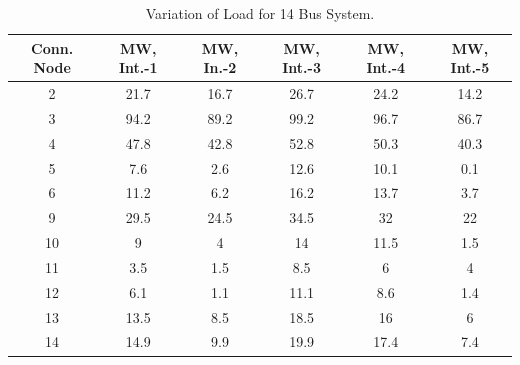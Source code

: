 \documentclass[preprint,12pt,3p]{elsarticle}
\begin{document}
\begin{table}[ht] 

\caption{Variation of Load for 14 Bus System.} %

\centering %

\begin{tabular}{| c | c | c | c | c | c |} %

\hline\hline %

Conn. Node & MW, Int.-1 & MW, In.-2 & MW, Int.-3  & MW, Int.-4 & MW, Int.-5 \\ [0.5ex] %


\hline %

2 &	21.7 &	16.7 &	26.7 &	24.2 &	14.2 \\ %
\hline
3 &	94.2 &	89.2 &	99.2 &	96.7 &	86.7 \\ %
\hline
4 &	47.8 &	42.8 &	52.8 &	50.3 &	40.3 \\ %
\hline
5 &	7.6 &	2.6 &	12.6 &	10.1 &	0.1 \\ %
\hline
6 &	11.2 &	6.2 &	16.2 &	13.7 &	3.7 \\ %
\hline
9 &	29.5 &	24.5 &	34.5 &	32 &	22 \\ %
\hline
10 &	9 &	4 &	14 &	11.5 &	1.5 \\ %
\hline
11 &	3.5 &	1.5 &	8.5 &	6 &	4 \\ %
\hline
12 &	6.1 &	1.1 &	11.1 &	8.6 &	1.4 \\ %
\hline
13 &	13.5 &	8.5 &	18.5 &	16 &	6 \\ %
\hline
14 &	14.9 &	9.9 &	19.9 &	17.4 &	7.4 \\ %
\hline
\end{tabular} 

\label{table:14LASCOPFLoadModified} %

\end{table}
\end{document}
